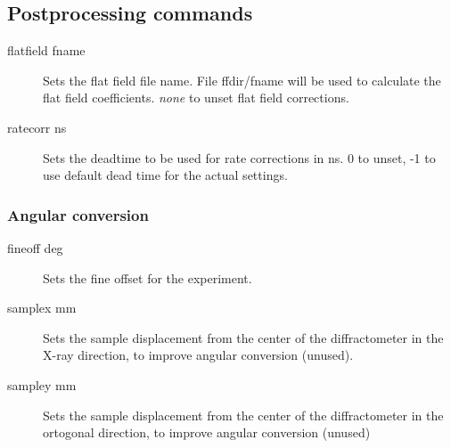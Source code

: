 \documentclass{article}
\begin{document}
\subsection{Postprocessing commands}
\begin{description}      
\item[flatfield fname] Sets the flat field file name. File ffdir/fname will be used to calculate the flat field coefficients. \textit{none} to unset flat field corrections. 
\item[ratecorr ns] Sets the deadtime to be used for rate corrections in ns. 0 to unset, -1 to use default dead time for the actual settings.
\end{description}


\subsubsection{Angular conversion}

\begin{description}
\item[fineoff deg] Sets the fine offset for the experiment.
\item[samplex mm] Sets the sample displacement from the center of the diffractometer in the X-ray direction, to improve angular conversion (unused).
\item[sampley mm] Sets the sample displacement from the center of the diffractometer in the ortogonal direction, to improve angular conversion (unused)
\end{description}
\end{document}
